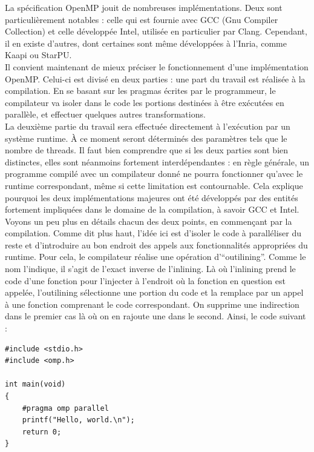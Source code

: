 \documentclass{report}
\begin{document}
La spécification OpenMP jouit de nombreuses implémentations. Deux sont particulièrement notables : celle
qui est fournie avec GCC (Gnu Compiler Collection) et celle développée Intel, utilisée en particulier
par Clang. Cependant, il en existe d'autres, dont certaines sont même développées à l'Inria, comme Kaapi
ou StarPU.
\\Il convient maintenant de mieux préciser le fonctionnement d'une implémentation OpenMP. Celui-ci est
divisé en deux parties : une part du travail est réalisée à la compilation. En se basant sur les pragmas
écrites par le programmeur, le compilateur va isoler dans le code les portions destinées à être exécutées
en parallèle, et effectuer quelques autres transformations. 
\\ La deuxième partie du travail sera effectuée directement à l'exécution par un système runtime. À ce 
moment seront déterminés des paramètres tels que le nombre de threads. Il faut bien comprendre que si les
deux parties sont bien distinctes, elles sont néanmoins fortement interdépendantes : en règle générale,
un programme compilé avec un compilateur donné ne pourra fonctionner qu'avec le runtime correspondant,
même si cette limitation est contournable. Cela explique pourquoi les deux implémentations majeures ont
été développés par des entités fortement impliquées dans le domaine de la  compilation, à 
savoir GCC et Intel. 
\\Voyons un peu plus en détails chacun des deux points, en commençant par la compilation. Comme dit plus
haut, l'idée ici est d'isoler le code à paralléliser du reste et d'introduire au bon endroit des appels
aux fonctionnalités appropriées du runtime. Pour cela, le compilateur réalise une opération
d'``outilining''. Comme le nom l'indique, il s'agit de l'exact inverse de l'inlining. Là où l'inlining
prend le code d'une fonction pour l'injecter à l'endroit où la fonction en question est appelée, 
l'outilining sélectionne une portion du code et la remplace par un appel à une fonction comprenant le
code correspondant. On supprime une indirection dans le premier cas là où on en rajoute une dans le 
second. Ainsi, le code suivant :
\begin{lstlisting}
#include <stdio.h>
#include <omp.h>

int main(void)
{
    #pragma omp parallel
    printf("Hello, world.\n");
    return 0;
}


\end{lstlisting}
\end{document}
